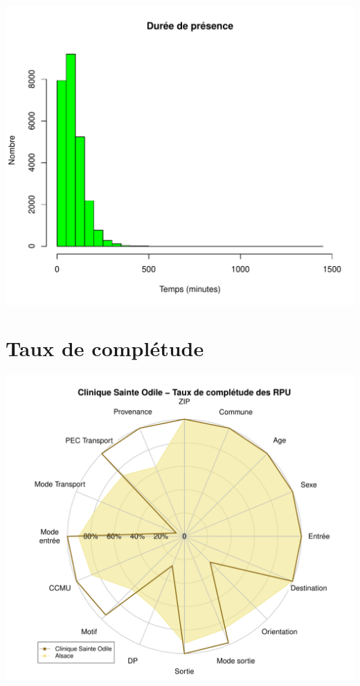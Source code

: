 \documentclass[12pt,english,french,twoside]{book}\usepackage[]{graphicx}\usepackage[]{color}
\makeatletter
\def\maxwidth{ %
  \ifdim\Gin@nat@width>\linewidth
    \linewidth
  \else
    \Gin@nat@width
  \fi
}
\newenvironment{knitrout}{}{} %
\makeatother
\begin{document}
\begin{knitrout}
\color{fgcolor}
\includegraphics[width=\maxwidth]{figure/graphe_odi-1} 

\end{knitrout}

\section*{Taux de complétude}

\begin{knitrout}
\color{fgcolor}
\includegraphics[width=\maxwidth]{figure/compl_odi-1} 

\end{knitrout}
\end{document}
